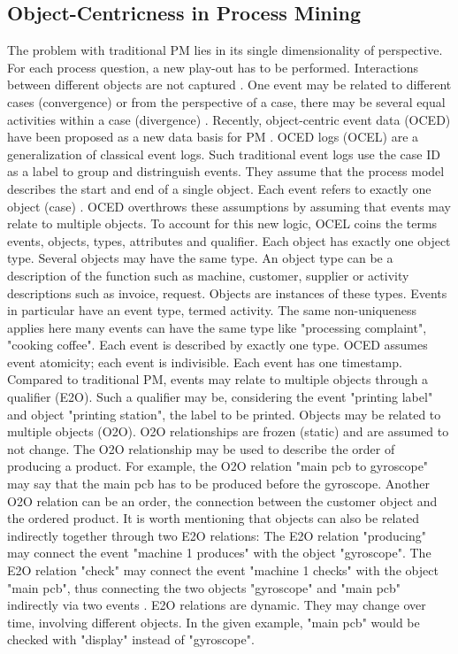 \subsection{Object-Centricness in Process Mining}
\label{sec:object-centric-event-logs}

The problem with traditional PM lies in its single dimensionality of perspective. For each process question, a new play-out has to be performed. Interactions between different objects are not captured \autocite{van2023object}. One event may be related to different cases (convergence) or from the perspective of a case, there may be several equal activities within a case (divergence) \autocite{van2019object}.
Recently, object-centric event data (OCED) have been proposed as a new data basis for PM \autocite{van2019object}. OCED logs (OCEL) are a generalization of classical event logs. Such traditional event logs use the case ID as a label to group and distringuish events. They assume that the process model describes the start and end of a single object. Each event refers to exactly one object (case) \autocite{van2023object}. OCED overthrows these assumptions by assuming that events may relate to multiple objects. To account for this new logic, OCEL coins the terms events, objects, types, attributes and qualifier. Each object has exactly one object type. Several objects may have the same type. An object type can be a description of the function such as machine, customer, supplier or activity descriptions such as invoice, request. Objects are instances of these types. Events in particular have an event type, termed activity. The same non-uniqueness applies here \textemdash many events can have the same type like "processing complaint", "cooking coffee". Each event is described by exactly one type. OCED assumes event atomicity; each event is indivisible. Each event has one timestamp. Compared to traditional PM, events may relate to multiple objects through a qualifier (E2O). Such a qualifier may be, considering the event "printing label" and object "printing station", the label to be printed. Objects may be related to multiple objects (O2O). O2O relationships are frozen (static) and are assumed to not change. The O2O relationship may be used to describe the order of producing a product. For example, the O2O relation "main pcb to gyroscope" may say that the main pcb has to be produced before the gyroscope. Another O2O relation can be an order, the connection between the customer object and the ordered product. It is worth mentioning that objects can also be related indirectly together through two E2O relations: The E2O relation "producing" may connect the event "machine 1 produces" with the object "gyroscope". The E2O relation "check" may connect the event "machine 1 checks" with the object "main pcb", thus connecting the two objects "gyroscope" and "main pcb" indirectly via two events \autocite{van2019object}. E2O relations are dynamic. They may change over time, involving different objects. In the given example, "main pcb" would be checked with "display" instead of "gyroscope".

